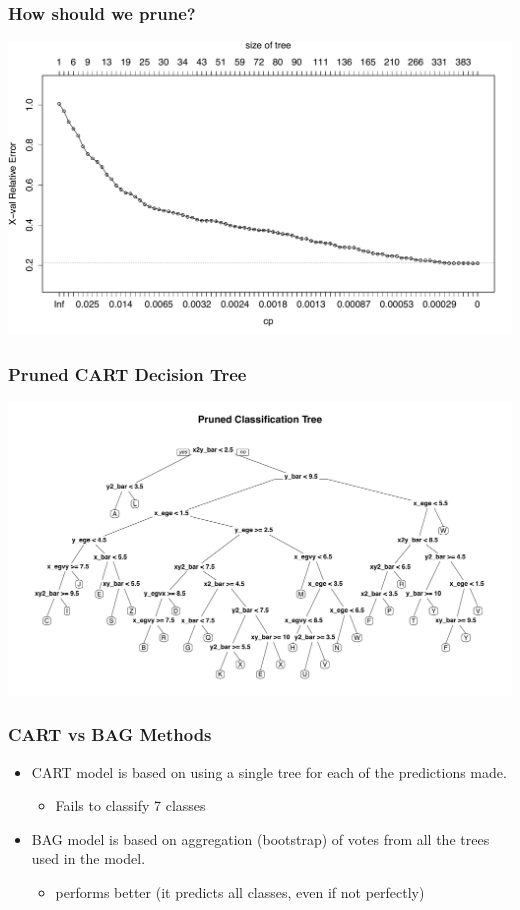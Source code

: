 \documentclass{beamer}
\begin{document}
\begin{frame}
\frametitle{How should we prune?}
\begin{center} 
\includegraphics[width=1 \textwidth]{cpPlot}
\end{center}

\end{frame}

\begin{frame}
\frametitle{Pruned CART Decision Tree}
\begin{center} 
\includegraphics[width=1 \textwidth]{PrunedCT}
\end{center}
\end{frame}

\begin{frame}
\frametitle{CART vs BAG Methods}
\begin{itemize}
\item CART model is based on using a single tree for each of the predictions made.  
\begin{itemize}
\item Fails to classify 7 classes
\end{itemize}
\item BAG model is based on aggregation (bootstrap) of votes from all the trees used in the model.  
\begin{itemize}
\item performs better (it predicts all classes, even if not perfectly)
\end{itemize}
\end{itemize}

\end{frame}
\end{document}
